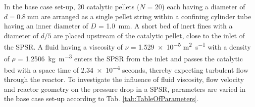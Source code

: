 In the base case set-up, 20 catalytic pellets ($N$ = 20) each having a diameter of $d = \SI{0.8}{\milli\meter}$ are arranged as a single pellet string within a confining cylinder tube having an inner diameter of $D$ = \SI{1.0}{\milli\meter}. A short bed of inert fines with a diameter of $d/5$ are placed upstream of the catalytic pellet, close to the inlet of the SPSR. A fluid having a viscosity of $\nu$ = \num{1.529e-5} \si{\meter^2\per\second} with a density of $\rho$ = \SI{1.2506}{\kilo\gram\per\cubic\metre} enters the SPSR from the inlet and passes the catalytic bed with a space time of \num{2.34e-4} seconds, thereby expecting turbulent flow through the reactor. To investigate the influence of fluid viscosity, flow velocity and reactor geometry on the pressure drop in a SPSR, parameters are varied in the base case set-up according to Tab. \ref{tab:TableOfParameters}.
